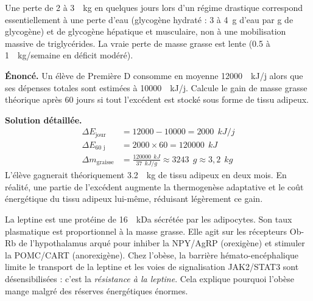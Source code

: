 \documentclass[11pt]{article}
\begin{document}
\begin{attention}
Une perte de \num{2} à \num{3}~\SI{}{kg} en quelques jours lors d'un régime drastique correspond essentiellement à une perte d'eau (glycogène hydraté : \num{3} à \num{4}~g d'eau par g de glycogène) et de glycogène hépatique et musculaire, non à une mobilisation massive de triglycérides. La vraie perte de masse grasse est lente (\num{0,5} à \num{1}~\SI{}{kg/semaine} en déficit modéré).
\end{attention}

\begin{exoresolu}
\textbf{Énoncé.} Un élève de Première D consomme en moyenne \num{12000}~\SI{}{kJ/j} alors que ses dépenses totales sont estimées à \num{10000}~\SI{}{kJ/j}. Calcule le gain de masse grasse théorique après 60 jours si tout l'excédent est stocké sous forme de tissu adipeux.

\textbf{Solution détaillée.}
\begin{align*}
\Delta E_{\text{jour}} &= 12000 - 10000 = 2000~\SI{}{kJ/j} \\
\Delta E_{\text{60 j}} &= 2000 \times 60 = 120000~\SI{}{kJ} \\
\Delta m_{\text{graisse}} &= \frac{120000~\SI{}{kJ}}{37~\SI{}{kJ/g}} \approx 3243~\SI{}{g} \approx 3,2~\SI{}{kg}
\end{align*}
L'élève gagnerait théoriquement \num{3,2}~\SI{}{kg} de tissu adipeux en deux mois. En réalité, une partie de l'excédent augmente la thermogenèse adaptative et le coût énergétique du tissu adipeux lui-même, réduisant légèrement ce gain.
\end{exoresolu}

\begin{savaistu}
La leptine est une protéine de \num{16}~\SI{}{kDa} sécrétée par les adipocytes. Son taux plasmatique est proportionnel à la masse grasse. Elle agit sur les récepteurs Ob-Rb de l'hypothalamus arqué pour inhiber la NPY/AgRP (orexigène) et stimuler la POMC/CART (anorexigène). Chez l'obèse, la barrière hémato-encéphalique limite le transport de la leptine et les voies de signalisation JAK2/STAT3 sont désensibilisées : c'est la \emph{résistance à la leptine}. Cela explique pourquoi l'obèse mange malgré des réserves énergétiques énormes.
\end{savaistu}
\end{document}
